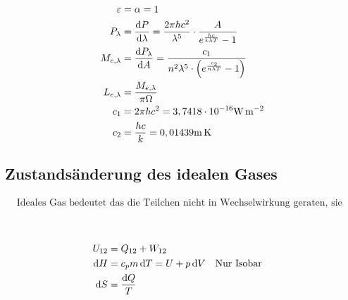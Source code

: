 \begin{boxleft}
\\
\\
\\
\\
\\
\end{boxleft}\begin{boxrightshaded}
\begin{align*}
\varepsilon&=\alpha=1\\
P_\lambda&=\frac{\diff P}{\diff \lambda}=\frac{2\pi h c^2}{\lambda^5}\cdot\frac{A}{e^{\frac{hc}{k\lambda T}}-1}\\
M_{e,\lambda}&=\frac{\diff P_\lambda}{\diff A}=\frac{c_1}{n^2\lambda^5\cdot\left(e^{\frac{c_2}{n\lambda T}}-1\right)}\\
L_{e,\lambda}&=\frac{M_{e,\lambda}}{\pi\Omega}\\
c_1&=2\pi h c^2=3,7418\cdot10^{-16}\si{\watt\per\metre\tothe{2}}\\
c_2&=\frac{h c}{k}=0,01439\si{\metre\kelvin}
\end{align*}
\end{boxrightshaded}

\subsection{Zustandsänderung des idealen Gases}


\begin{boxshaded}
\begin{align*}
&\text{Ideales Gas bedeutet das die Teilchen nicht in Wechselwirkung geraten, sie kein Volumen und es kommt zu keinen Phasenübergang}
\end{align*}
\end{boxshaded}

\begin{boxleft}
\\
\end{boxleft}\begin{boxrightshaded}
\begin{align*}
U_{12}&=Q_{12}+W_{12}\\
\mathop{}\!\mathrm{d} H&=c_pm\mathop{}\!\mathrm{d} T=U+p\mathop{}\!\mathrm{d} V&&\text{Nur Isobar}\\
\mathop{}\!\mathrm{d} S&=\frac{\mathop{}\!\mathrm{d} Q}{T}
\end{align*}
\end{boxrightshaded}


